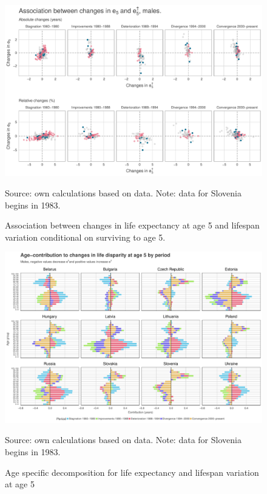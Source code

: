 \documentclass{article}
\begin{document}
\newpage
\begin{figure}[h!]
\caption{Association between changes in life expectancy at age 5 and lifespan variation conditional on surviving to age 5.}
\centering
\begin{center}
\includegraphics[scale=.45]{Figures/Changes_age5.pdf}
\end{center}
Source: own calculations based on \citet{HMD} data. Note: data for Slovenia begins in 1983.
\end{figure}

\newpage
\begin{figure}[h!]
\caption{Age specific decomposition for life expectancy and lifespan variation at age 5}
\centering
\begin{center}
\includegraphics[scale=.45]{Figures/Decomp_ed_males_5.pdf}
\end{center}
Source: own calculations based on \citet{HMD} data. Note: data for Slovenia begins in 1983.
\end{figure}
\end{document}
